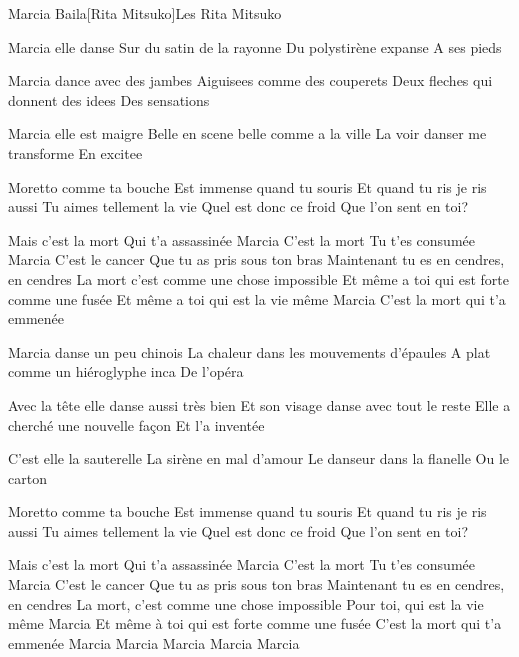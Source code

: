 \begin{Song}{Marcia Baila}[Rita Mitsuko]{Les Rita Mitsuko}
\begin{multicols}{2}

\begin{Verse}
Marcia elle danse
Sur du satin de la rayonne
Du polystirène expanse
A ses pieds
\espaceInterStrophe

Marcia dance avec des jambes
Aiguisees comme des couperets
Deux fleches qui donnent des idees
Des sensations
\espaceInterStrophe

Marcia elle est maigre
Belle en scene belle comme a la ville
La voir danser me transforme
En excitee
\end{Verse}
\espaceInterStrophe

\begin{PreChorus}
Moretto comme ta bouche
Est immense quand tu souris
Et quand tu ris je ris aussi
Tu aimes tellement la vie
Quel est donc ce froid
Que l'on sent en toi?
\end{PreChorus}
\espaceInterStrophe

\begin{Chorus}
Mais c'est la mort
Qui t'a assassinée Marcia
C'est la mort
Tu t'es consumée Marcia
C'est le cancer
Que tu as pris sous ton bras
Maintenant tu es en cendres, en cendres
La mort c'est comme une chose impossible
Et même a toi qui est forte comme une fusée
Et même a toi qui est la vie même Marcia
C'est la mort qui t'a emmenée
\end{Chorus}
\vfill
\columnbreak

\begin{Verse}
Marcia danse un peu chinois
La chaleur dans les mouvements d'épaules
A plat comme un hiéroglyphe inca
De l'opéra
\espaceInterStrophe

Avec la tête elle danse aussi très bien
Et son visage danse avec tout le reste
Elle a cherché une nouvelle façon
Et l'a inventée
\espaceInterStrophe

C'est elle la sauterelle
La sirène en mal d'amour
Le danseur dans la flanelle
Ou le carton
\end{Verse}
\espaceInterStrophe

\begin{PreChorus}
Moretto comme ta bouche
Est immense quand tu souris
Et quand tu ris je ris aussi
Tu aimes tellement la vie
Quel est donc ce froid
Que l'on sent en toi?
\end{PreChorus}
\espaceInterStrophe

\begin{Chorus}
Mais c'est la mort
Qui t'a assassinée Marcia
C'est la mort
Tu t'es consumée Marcia
C'est le cancer
Que tu as pris sous ton bras
Maintenant tu es en cendres, en cendres
La mort, c'est comme une chose impossible
Pour toi, qui est la vie même Marcia
Et même à toi qui est forte comme une fusée
C'est la mort qui t'a emmenée
Marcia Marcia Marcia Marcia Marcia
\end{Chorus}
\end{multicols}


\end{Song}
